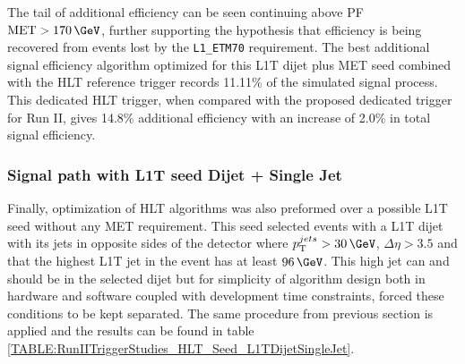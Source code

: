 The tail of additional efficiency can be seen continuing above \gls{PF} $\text{MET}>170\,\GeV$, further supporting the hypothesis that efficiency is being recovered from events lost by the \verb|L1_ETM70| requirement. The best additional signal efficiency algorithm optimized for this \gls{L1T} dijet plus \gls{MET} seed combined with the \gls{HLT} reference trigger records 11.11\% of the simulated signal process. This dedicated \gls{HLT} trigger, when compared with the proposed dedicated trigger for Run II, gives 14.8\% additional efficiency with an increase of 2.0\% in total signal efficiency.

\subsubsection{Signal path with L1T seed Dijet + Single Jet}
\label{SECTION:RunIITriggerStudies_HLTAlgorithmDevelopment_L1TDijetSingleJet}


Finally, optimization of \gls{HLT} algorithms was also preformed over a possible \gls{L1T} seed without any \gls{MET} requirement. This seed selected events with a \gls{L1T} dijet with its jets in opposite sides of the detector where $\pt^{jets}>30\,\GeV$, $\Delta\eta>3.5$ and that the highest \pt \gls{L1T} jet in the event has at least $96\,\GeV$. This high \pt jet can and should be in the selected dijet but for simplicity of algorithm design both in hardware and software coupled with development time constraints, forced these conditions to be kept separated. The same procedure from previous section is applied and the results can be found in table \ref{TABLE:RunIITriggerStudies_HLT_Seed_L1TDijetSingleJet}.

